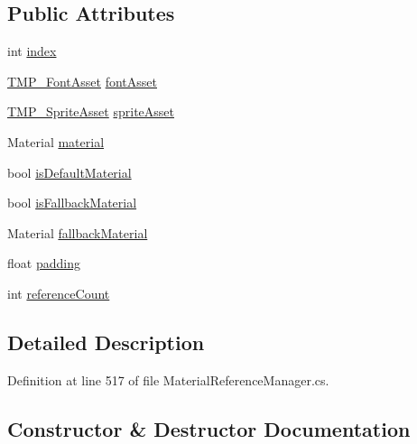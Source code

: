 \subsection*{Public Attributes}
\begin{DoxyCompactItemize}
\item 
int \mbox{\hyperlink{struct_t_m_pro_1_1_material_reference_af0e1e670567aeaa6b1b1bc67b41d4d3d}{index}}
\item 
\mbox{\hyperlink{class_t_m_pro_1_1_t_m_p___font_asset}{T\+M\+P\+\_\+\+Font\+Asset}} \mbox{\hyperlink{struct_t_m_pro_1_1_material_reference_a57d6038454b7627a678c178751ae7b2e}{font\+Asset}}
\item 
\mbox{\hyperlink{class_t_m_pro_1_1_t_m_p___sprite_asset}{T\+M\+P\+\_\+\+Sprite\+Asset}} \mbox{\hyperlink{struct_t_m_pro_1_1_material_reference_a1ebf5e832a0bc9cab36327cc0208362e}{sprite\+Asset}}
\item 
Material \mbox{\hyperlink{struct_t_m_pro_1_1_material_reference_ab5f2e88a52f52cea5eb3f62ff9d452ef}{material}}
\item 
bool \mbox{\hyperlink{struct_t_m_pro_1_1_material_reference_ab986ec897bc828a682be0bc9d254e0a5}{is\+Default\+Material}}
\item 
bool \mbox{\hyperlink{struct_t_m_pro_1_1_material_reference_ae529e7d956ccdd30cb246eab15ffe15b}{is\+Fallback\+Material}}
\item 
Material \mbox{\hyperlink{struct_t_m_pro_1_1_material_reference_afb2e5da38674a7a363ad2b4f3c6215d7}{fallback\+Material}}
\item 
float \mbox{\hyperlink{struct_t_m_pro_1_1_material_reference_ab1a087e354c66d5ab731cba0beb4ad9a}{padding}}
\item 
int \mbox{\hyperlink{struct_t_m_pro_1_1_material_reference_ab6c0b50ab86f6743bb71af70dd2ba0ed}{reference\+Count}}
\end{DoxyCompactItemize}


\subsection{Detailed Description}


Definition at line 517 of file Material\+Reference\+Manager.\+cs.



\subsection{Constructor \& Destructor Documentation}
\mbox{\label{struct_t_m_pro_1_1_material_reference_a5af83438b727dbb8cf9c49b02fdc2fda}} 
